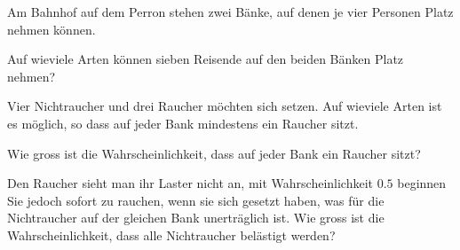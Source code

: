 Am Bahnhof auf dem Perron stehen zwei Bänke, auf denen je vier
Personen Platz nehmen können.
\begin{teilaufgaben}
\item
Auf wieviele Arten können sieben Reisende auf den beiden Bänken Platz
nehmen?
\item
Vier Nichtraucher und drei Raucher möchten sich setzen.
Auf wieviele Arten ist es möglich, so dass auf jeder Bank mindestens
ein Raucher sitzt.
\item
Wie gross ist die Wahrscheinlichkeit, dass auf jeder Bank ein Raucher
sitzt?
\item
Den Raucher sieht man ihr Laster nicht an, mit Wahrscheinlichkeit $0.5$
beginnen Sie jedoch sofort zu rauchen, wenn sie sich gesetzt haben, was
für die Nichtraucher auf der gleichen Bank unerträglich ist.
Wie gross ist die Wahrscheinlichkeit, dass alle Nichtraucher belästigt
werden?
\end{teilaufgaben}

